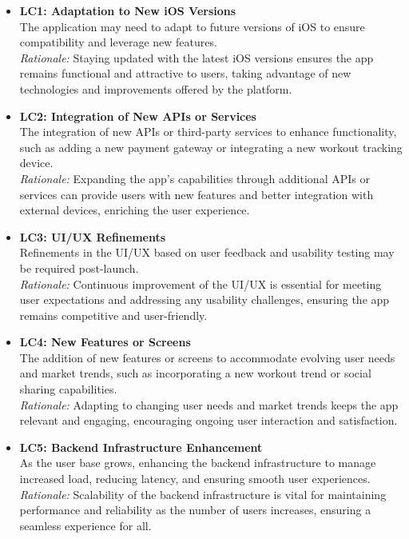\documentclass[12pt]{article}
\begin{document}
\begin{itemize}
    \item \textbf{LC1: Adaptation to New iOS Versions}\\
    The application may need to adapt to future versions of iOS to ensure compatibility and leverage new features.\\
    \textit{Rationale:} Staying updated with the latest iOS versions ensures the app remains functional and attractive to users, taking advantage of new technologies and improvements offered by the platform.
    
    \item \textbf{LC2: Integration of New APIs or Services}\\
    The integration of new APIs or third-party services to enhance functionality, such as adding a new payment gateway or integrating a new workout tracking device.\\
    \textit{Rationale:} Expanding the app’s capabilities through additional APIs or services can provide users with new features and better integration with external devices, enriching the user experience.
    
    \item \textbf{LC3: UI/UX Refinements}\\
    Refinements in the UI/UX based on user feedback and usability testing may be required post-launch.\\
    \textit{Rationale:} Continuous improvement of the UI/UX is essential for meeting user expectations and addressing any usability challenges, ensuring the app remains competitive and user-friendly.
    
    \item \textbf{LC4: New Features or Screens}\\
    The addition of new features or screens to accommodate evolving user needs and market trends, such as incorporating a new workout trend or social sharing capabilities.\\
    \textit{Rationale:} Adapting to changing user needs and market trends keeps the app relevant and engaging, encouraging ongoing user interaction and satisfaction.
    
    \item \textbf{LC5: Backend Infrastructure Enhancement}\\
    As the user base grows, enhancing the backend infrastructure to manage increased load, reducing latency, and ensuring smooth user experiences.\\
    \textit{Rationale:} Scalability of the backend infrastructure is vital for maintaining performance and reliability as the number of users increases, ensuring a seamless experience for all.
    

\end{itemize}
\end{document}
